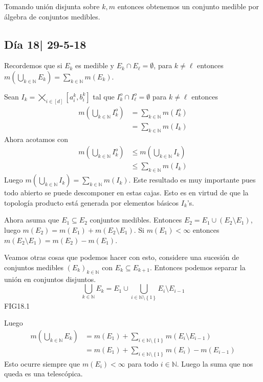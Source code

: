 \documentclass[12pt]{article}
\theoremstyle{plain}
\theoremstyle{definition}
\theoremstyle{remark}
\numberwithin{equation}{section}
\newcommand{\bN}{\mathbb{N}}        %
\renewcommand{\leq}{\leqslant}      %
\renewcommand{\:}{\colon}           %
\newcommand{\conj}[1]{\left\lbrace#1\right\rbrace}
\newcommand{\bonj}[1]{\left\lbrack#1\right\rbrack}
\begin{document}
\begin{multicols}{2}
\begin{ptcbp}
Tomando unión disjunta sobre $k,m$ entonces obtenemos un conjunto medible por álgebra de conjuntos medibles.
\end{ptcbp}

\subsection{Día 18| 29-5-18}

Recordemos que si $E_k$ es medible y $E_k\cap E_\ell=\emptyset$, para $k\neq \ell$ entonces $m(\bigcup_{k\in\bN}E_k)=\sum_{k\in\bN}m(E_k)$. \par
Sean $I_k=\bigtimes_{i\in\bonj{d}}\bonj{a_i^k,b_i^k}$ tal que $I_k^o\cap I_\ell^o=\emptyset$ para $k\neq\ell$ entonces
\begin{align*}
  m\left(\bigcup_{k\in\bN}I_k^o\right)&=\sum_{k\in\bN}m(I_k^o)\\
  &=\sum_{k\in\bN}m(I_k)
\end{align*}
Ahora acotamos con
\begin{align*}
   m\left(\bigcup_{k\in\bN}I_k^o\right)&\leq m\left(\bigcup_{k\in\bN}I_k\right)\\
   &\leq \sum_{k\in\bN}m(I_k)
\end{align*}
Luego $ m\left(\bigcup_{k\in\bN}I_k\right)=\sum_{k\in\bN}m(I_k)$. Este resultado es muy importante pues todo abierto se puede descomponer en estas cajas. Esto es en virtud de que la topología producto está generada por elementos básicos $I_k$'s.\par
Ahora asuma que $E_1\subseteq E_2$ conjuntos medibles. Entonces $E_2=E_1\cup (E_2\setminus E_1)$, luego $m(E_2)=m(E_1)+m(E_2\setminus E_1)$. Si $m(E_1)<\infty$ entonces $m(E_2\setminus E_1)=m(E_2)-m(E_1)$.\par
Veamos otras cosas que podemos hacer con esto, considere una sucesión de conjuntos medibles $(E_k)_{k\in\bN}$ con $E_k\subseteq E_{k+1}$. Entonces podemos separar la unión  en conjuntos disjuntos.
$$\bigcup_{k\in\bN}E_k=E_1\cup\bigcup_{i\in\bN\setminus\conj{1}}E_i\setminus E_{i-1}$$
FIG18.1\par
Luego
\begin{align*}
  m\left(\bigcup_{k\in\bN}E_k\right) &=m(E_1)+\sum_{i\in\bN\setminus\conj{1}}m(E_i\setminus E_{i-1})\\
  &=m(E_1)+\sum_{i\in\bN\setminus\conj{1}}m(E_i)-m(E_{i-1})
\end{align*}
Esto ocurre siempre que $m(E_i)<\infty$ para todo $i\in\bN$. Luego la suma que nos queda es una telescópica.
\begin{align*}

\end{align*}
\end{multicols}
\end{document}
